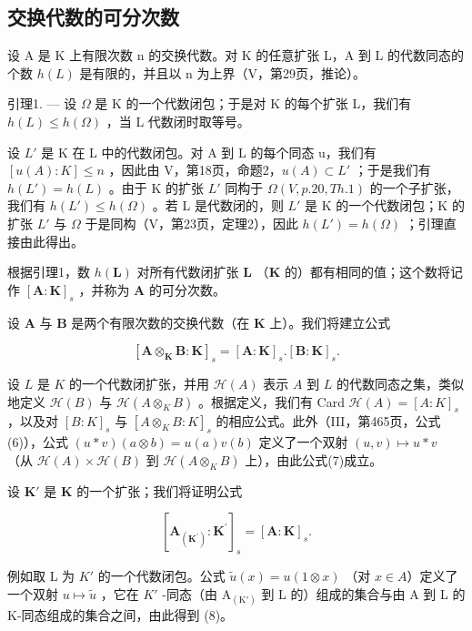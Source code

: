 \subsection{交换代数的可分次数}

设 A 是 K 上有限次数 n 的交换代数。对 K 的任意扩张 L，A 到 L 的代数同态的个数 \(h(L)\) 是有限的，并且以 n 为上界（V，第29页，推论）。

引理1. --- 设 \(\Omega\) 是 K 的一个代数闭包；于是对 K 的每个扩张 L，我们有 \(h(L) \leqslant h(\Omega)\) ，当 L 代数闭时取等号。

设 \(L'\) 是 K 在 L 中的代数闭包。对 A 到 L 的每个同态 u，我们有 \([u(A):K] \leqslant n\) ，因此由 V，第18页，命题2，\(u(A) \subset L'\) ；于是我们有 \(h(L') = h(L)\) 。由于 K 的扩张 \(L'\) 同构于 \(\Omega(V, p. 20, Th. 1)\) 的一个子扩张，我们有 \(h(L') \leqslant h(\Omega)\) 。若 L 是代数闭的，则 \(L'\) 是 K 的一个代数闭包；K 的扩张 \(L'\) 与 \(\Omega\) 于是同构（V，第23页，定理2），因此 \(h(L') = h(\Omega)\) ；引理直接由此得出。

根据引理1，数 \(h(\mathbf{L})\) 对所有代数闭扩张 \(\mathbf{L}\) （\(\mathbf{K}\) 的）都有相同的值；这个数将记作 \([\mathbf{A}:\mathbf{K}]_s\) ，并称为 \(\mathbf{A}\) 的可分次数。

设 \(\mathbf{A}\) 与 \(\mathbf{B}\) 是两个有限次数的交换代数（在 \(\mathbf{K}\) 上）。我们将建立公式

\[
[ \mathbf {A} \otimes_ {\mathbf {K}} \mathbf {B}: \mathbf {K} ] _ {s} = [ \mathbf {A}: \mathbf {K} ] _ {s}. [ \mathbf {B}: \mathbf {K} ] _ {s}.\tag{7}
\]

设 \(L\) 是 \(K\) 的一个代数闭扩张，并用 \(\mathcal{H}(A)\) 表示 \(A\) 到 \(L\) 的代数同态之集，类似地定义 \(\mathcal{H}(B)\) 与 \(\mathcal{H}(A \otimes_K B)\) 。根据定义，我们有 Card \(\mathcal{H}(A) = [A : K]_s\) ，以及对 \([B:K]_{s}\) 与 \([A\otimes_{K}B:K]_{s}\) 的相应公式。此外（III，第465页，公式(6)），公式 \((u*v)(a\otimes b)=u(a)v(b)\) 定义了一个双射 \((u,v)\mapsto u*v\) （从 \(\mathcal{H}(A)\times\mathcal{H}(B)\) 到 \(\mathcal{H}(A\otimes_{K}B)\) 上），由此公式(7)成立。

设 \(\mathbf{K}'\) 是 \(\mathbf{K}\) 的一个扩张；我们将证明公式

\[
[ \mathbf {A} _ {(\mathbf {K} ^ {\prime})}: \mathbf {K} ^ {\prime} ] _ {s} = [ \mathbf {A}: \mathbf {K} ] _ {s}.\tag{8}
\]

例如取 L 为 \(K'\) 的一个代数闭包。公式 \(\tilde{u}(x)=u(1\otimes x)\) （对 \(x\in A\)）定义了一个双射 \(u\mapsto\tilde{u}\) ，它在 \(K'\) -同态（由 \(\mathrm{A}_{(\mathrm{K}')}\) 到 L 的）组成的集合与由 A 到 L 的 K-同态组成的集合之间，由此得到 (8)。

